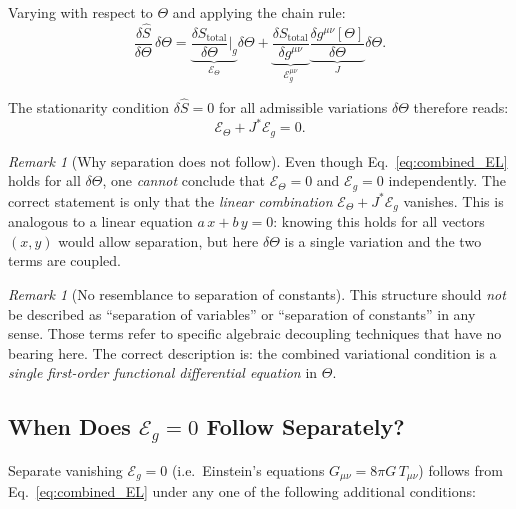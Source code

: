 \documentclass[12pt]{article}
\theoremstyle{definition}
\theoremstyle{remark}
\newtheorem{remark}[theorem]{Remark}
\begin{document}
Varying with respect to $\Theta$ and applying the chain rule:
\begin{equation}
  \frac{\delta\hat{S}}{\delta\Theta}\,\delta\Theta
  = \underbrace{\frac{\delta S_{\text{total}}}{\delta\Theta}\bigg|_g}_{\mathcal{E}_\Theta}
    \delta\Theta
  + \underbrace{\frac{\delta S_{\text{total}}}{\delta g^{\mu\nu}}}_{\mathcal{E}_g^{\mu\nu}}
    \underbrace{\frac{\delta g^{\mu\nu}[\Theta]}{\delta\Theta}}_{J}\delta\Theta.
  \label{eq:variation_chain}
\end{equation}

The stationarity condition $\delta\hat{S} = 0$ for all admissible variations
$\delta\Theta$ therefore reads:
\begin{equation}
  \boxed{
    \mathcal{E}_\Theta + J^{*}\mathcal{E}_g = 0.
  }
  \label{eq:combined_EL}
\end{equation}

\begin{remark}[Why separation does not follow]
\label{rem:no_separation}
Even though Eq.~\eqref{eq:combined_EL} holds for all $\delta\Theta$, one
\emph{cannot} conclude that $\mathcal{E}_\Theta = 0$ and $\mathcal{E}_g = 0$
independently.  The correct statement is only that the \emph{linear combination}
$\mathcal{E}_\Theta + J^{*}\mathcal{E}_g$ vanishes.  This is analogous to a
linear equation $a\,x + b\,y = 0$: knowing this holds for all vectors
$(x, y)$ would allow separation, but here $\delta\Theta$ is a single variation
and the two terms are coupled.
\end{remark}

\begin{remark}[No resemblance to separation of constants]
This structure should \emph{not} be described as ``separation of variables''
or ``separation of constants'' in any sense.  Those terms refer to specific
algebraic decoupling techniques that have no bearing here.
The correct description is: the combined variational condition is a
\emph{single first-order functional differential equation} in $\Theta$.
\end{remark}

\subsection{When Does $\mathcal{E}_g = 0$ Follow Separately?}
\label{subsec:when_sep}

Separate vanishing $\mathcal{E}_g = 0$ (i.e.\ Einstein's equations
$G_{\mu\nu} = 8\pi G\, T_{\mu\nu}$) follows from Eq.~\eqref{eq:combined_EL}
under any one of the following additional conditions:
\end{document}

